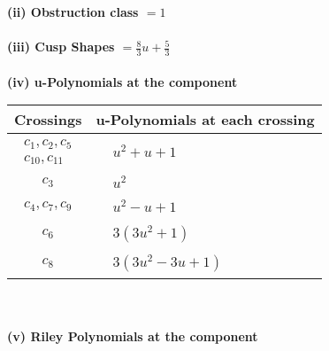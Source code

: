 \documentclass[1p]{elsarticle_modified}
\theoremstyle{definition}
\begin{document}
\flushleft \textbf{(ii) Obstruction class $= 1$}\\~\\
\flushleft \textbf{(iii) Cusp Shapes $= \frac{8}{3} u+\frac{5}{3}$}\\~\\
\newpage\renewcommand{\arraystretch}{1}
\flushleft \textbf{(iv) u-Polynomials at the component}\newline \\
\begin{tabular}{m{50pt}|m{274pt}}
Crossings & \hspace{64pt}u-Polynomials at each crossing \\
\hline $$\begin{aligned}c_{1},c_{2},c_{5}\\c_{10},c_{11}\end{aligned}$$&$\begin{aligned}
&u^2+u+1
\end{aligned}$\\
\hline $$\begin{aligned}c_{3}\end{aligned}$$&$\begin{aligned}
&u^2
\end{aligned}$\\
\hline $$\begin{aligned}c_{4},c_{7},c_{9}\end{aligned}$$&$\begin{aligned}
&u^2- u+1
\end{aligned}$\\
\hline $$\begin{aligned}c_{6}\end{aligned}$$&$\begin{aligned}
&3(3 u^2+1)
\end{aligned}$\\
\hline $$\begin{aligned}c_{8}\end{aligned}$$&$\begin{aligned}
&3(3 u^2-3 u+1)
\end{aligned}$\\
\hline
\end{tabular}\\~\\
\newpage\renewcommand{\arraystretch}{1}
\flushleft \textbf{(v) Riley Polynomials at the component}\newline \\
\end{document}
